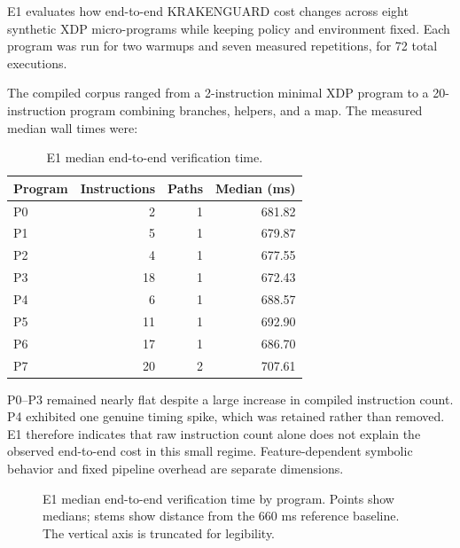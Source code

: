 \documentclass[12pt,a4paper]{article}
\begin{document}
E1 evaluates how end-to-end KRAKENGUARD cost changes across eight synthetic XDP micro-programs while keeping policy and environment fixed. Each program was run for two warmups and seven measured repetitions, for 72 total executions.

The compiled corpus ranged from a 2-instruction minimal XDP program to a 20-instruction program combining branches, helpers, and a map. The measured median wall times were:

\begin{table}[t]
\centering
\caption{E1 median end-to-end verification time.}
\label{tab:e1}
\begin{tabular}{lrrr}
\toprule
\textbf{Program} & \textbf{Instructions} & \textbf{Paths} & \textbf{Median (ms)}\\
\midrule
P0 & 2  & 1 & 681.82\\
P1 & 5  & 1 & 679.87\\
P2 & 4  & 1 & 677.55\\
P3 & 18 & 1 & 672.43\\
P4 & 6  & 1 & 688.57\\
P5 & 11 & 1 & 692.90\\
P6 & 17 & 1 & 686.70\\
P7 & 20 & 2 & 707.61\\
\bottomrule
\end{tabular}
\end{table}

P0--P3 remained nearly flat despite a large increase in compiled instruction count. P4 exhibited one genuine timing spike, which was retained rather than removed. E1 therefore indicates that raw instruction count alone does not explain the observed end-to-end cost in this small regime. Feature-dependent symbolic behavior and fixed pipeline overhead are separate dimensions.

\begin{figure}[htbp]
\centering
{}
\caption{E1 median end-to-end verification time by program. Points show medians; stems show distance from the 660 ms reference baseline. The vertical axis is truncated for legibility.}
\label{fig:e1-time}
\end{figure}
\end{document}
